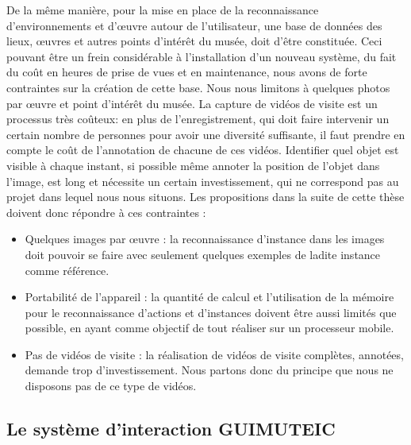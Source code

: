 De la même manière, pour la mise en place de la reconnaissance d'environnements et d'œuvre autour de l'utilisateur, une base de données des lieux, œuvres et autres points d'intérêt du musée, doit d'être constituée. 
Ceci pouvant être un frein considérable à l'installation d'un nouveau système, du fait du coût en heures de prise de vues et en maintenance, nous avons de forte contraintes sur la création de cette base. 
Nous nous limitons à quelques photos par œuvre et point d'intérêt du musée. 
La capture de vidéos de visite est un processus très coûteux: en plus de l'enregistrement, qui doit faire intervenir un certain nombre de personnes pour avoir une diversité suffisante, il faut prendre en compte le coût de l'annotation de chacune de ces vidéos.
Identifier quel objet est visible à chaque instant, si possible même annoter la position de l'objet dans l'image, est long et nécessite un certain investissement, qui ne correspond pas au projet dans lequel nous nous situons.
Les propositions dans la suite de cette thèse doivent donc répondre à ces contraintes :

\begin{itemize}
	\item Quelques images par œuvre : la reconnaissance d'instance dans les images doit pouvoir se faire avec seulement quelques exemples de ladite instance comme référence.
	\item Portabilité de l'appareil : la quantité de calcul et l’utilisation de la mémoire pour le reconnaissance d'actions et d'instances doivent être aussi limités que possible, en ayant comme objectif de tout réaliser sur un processeur mobile.
	\item Pas de vidéos de visite : la réalisation de vidéos de visite complètes, annotées, demande trop d'investissement. Nous partons donc du principe que nous ne disposons pas de ce type de vidéos.
\end{itemize}





\subsection{Le système d'interaction GUIMUTEIC}
\label{sec:systemeGUIMUTEIC}

